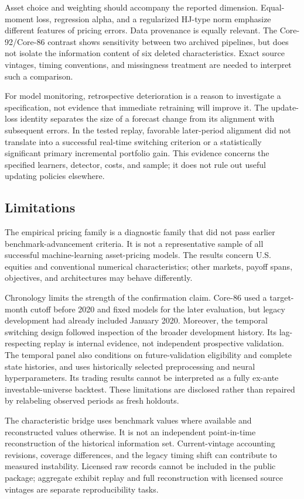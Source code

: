 Asset choice and weighting should accompany the reported dimension. Equal-moment loss, regression alpha, and a regularized HJ-type norm emphasize different features of pricing errors. Data provenance is equally relevant. The Core-92/Core-86 contrast shows sensitivity between two archived pipelines, but does not isolate the information content of six deleted characteristics. Exact source vintages, timing conventions, and missingness treatment are needed to interpret such a comparison.

For model monitoring, retrospective deterioration is a reason to investigate a specification, not evidence that immediate retraining will improve it. The update-loss identity separates the size of a forecast change from its alignment with subsequent errors. In the tested replay, favorable later-period alignment did not translate into a successful real-time switching criterion or a statistically significant primary incremental portfolio gain. This evidence concerns the specified learners, detector, costs, and sample; it does not rule out useful updating policies elsewhere.

\subsection{Limitations}

The empirical pricing family is a diagnostic family that did not pass earlier benchmark-advancement criteria. It is not a representative sample of all successful machine-learning asset-pricing models. The results concern U.S. equities and conventional numerical characteristics; other markets, payoff spans, objectives, and architectures may behave differently.

Chronology limits the strength of the confirmation claim. Core-86 used a target-month cutoff before 2020 and fixed models for the later evaluation, but legacy development had already included January 2020. Moreover, the temporal switching design followed inspection of the broader development history. Its lag-respecting replay is internal evidence, not independent prospective validation. The temporal panel also conditions on future-validation eligibility and complete state histories, and uses historically selected preprocessing and neural hyperparameters. Its trading results cannot be interpreted as a fully ex-ante investable-universe backtest. These limitations are disclosed rather than repaired by relabeling observed periods as fresh holdouts.

The characteristic bridge uses benchmark values where available and reconstructed values otherwise. It is not an independent point-in-time reconstruction of the historical information set. Current-vintage accounting revisions, coverage differences, and the legacy timing shift can contribute to measured instability. Licensed raw records cannot be included in the public package; aggregate exhibit replay and full reconstruction with licensed source vintages are separate reproducibility tasks.

